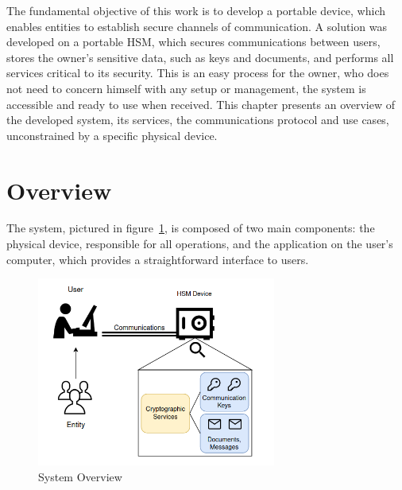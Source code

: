\cleardoublepage
\label{chap:arch}

The fundamental objective of this work is to develop a portable device,  which enables entities to establish secure channels of communication.
A solution was developed on a portable \ac{HSM}, which secures communications between users, stores the owner's sensitive data, such as keys and documents, and performs all services critical to its security. This is an easy process for the owner, who does not need to concern himself with any setup or management, the system is accessible and ready to use when received.
This chapter presents an overview of the developed system, its services, the communications protocol and use cases, unconstrained by a specific physical device.

\section{Overview}\label{chap:arch:overview}

The system, pictured in figure~\ref{fig:overview}, is composed of two main components: the physical device, responsible for all operations, and the application on the user's computer, which provides a straightforward interface to users.

\begin{figure}[h]
    \centering
    \includegraphics[width=0.7\textwidth]{./Images/overview.png}
    \caption{System Overview}
    \label{fig:overview}
\end{figure}

